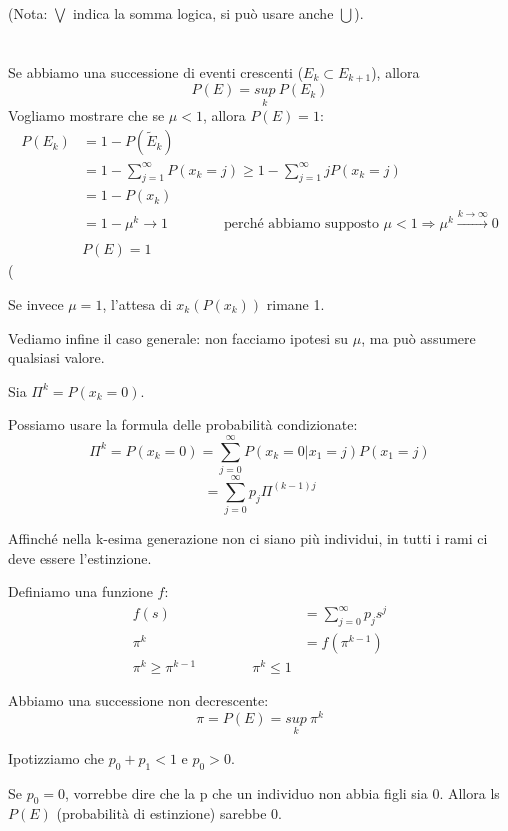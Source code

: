 \documentclass[a4paper,12pt]{book}
\begin{document}
(Nota: $\bigvee$ indica la somma logica, si può usare anche $\bigcup$).
\\
\\
\\
Se abbiamo una successione di eventi crescenti ($ E_k \subset E_{k+1} $), allora
$$ P(E) = \underset{k}{sup} \: P(E_k)$$
Vogliamo mostrare che se $\mu < 1$, allora $ P(E) = 1 $:
\begin{align*}
	P(E_k) & = 1 - P(\tilde{E}_k) \\
	& = 1 - \sum_{j=1}^{\infty}P(x_k = j) \ge 1 - \sum_{j=1}^{\infty}jP(x_k=j) \\
	& = 1 - P(x_k) \\
	& = 1-\mu^k \to 1 \qquad \qquad \text{perché abbiamo supposto } \mu < 1 \Rightarrow \mu^k \stackrel{k \to \infty}{\longrightarrow} 0 \\ \\
	& P(E) = 1
\end{align*}(

Se invece $\mu = 1$, l'attesa di $ x_k(P(x_k)) $ rimane 1.

Vediamo infine il caso generale: non facciamo ipotesi su $\mu$, ma può assumere qualsiasi valore.

Sia $ \Pi^k = P(x_k = 0) $.

Possiamo usare la formula delle probabilità condizionate:
$$ \Pi^k = P(x_k = 0) = \sum_{j=0}^{\infty} P(x_k = 0 | x_1 = j) P(x_1 = j) $$
$$ = \sum_{j=0}^{\infty} p_j\Pi^{(k-1)j} $$  %

Affinché nella k-esima generazione non ci siano più individui, in tutti i rami ci deve essere l'estinzione. 

Definiamo una funzione $ f $:
\begin{align*}
	f(s) & = \sum_{j=0}^{\infty} p_j s^j \\
	\pi^k & = f(\pi^{k-1}) \\
	\pi^k \ge \pi^{k-1} \qquad \qquad \pi^k \le 1
\end{align*}

Abbiamo una successione non decrescente:
$$ \pi = P(E) = \underset{k}{sup} \: \pi^k $$

Ipotizziamo che $ p_0 + p_1 < 1 $ e $ p_0 > 0 $.

Se $ p_0 = 0$, vorrebbe dire che la p che un individuo non abbia figli sia 0. Allora ls $ P(E) $ (probabilità di estinzione) sarebbe 0. 
\end{document}
